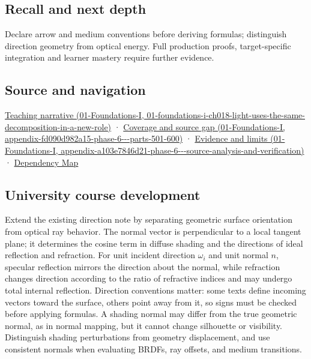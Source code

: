 \subsection{Recall and next depth}\label{appendix-44e00863b4d5-recall-and-next-depth}

Declare arrow and medium conventions before deriving formulas; distinguish direction geometry from optical energy. Full production proofs, target-specific integration and learner mastery require further evidence.

\subsection{Source and navigation}\label{appendix-44e00863b4d5-source-and-navigation}

\href{../01-Foundations-I/main.pdf\#nameddest=01-foundations-i-ch018-light-uses-the-same-decomposition-in-a-new-role}{Teaching narrative (01-Foundations-I, 01-foundations-i-ch018-light-uses-the-same-decomposition-in-a-new-role)} · \href{../01-Foundations-I/main.pdf\#nameddest=appendix-fd090d982a15-phase-6---parts-501-600}{Coverage and source gap (01-Foundations-I, appendix-fd090d982a15-phase-6-\/-\/-parts-501-600)} · \href{../01-Foundations-I/main.pdf\#nameddest=appendix-a103e7846d21-phase-6---source-analysis-and-verification}{Evidence and limits (01-Foundations-I, appendix-a103e7846d21-phase-6-\/-\/-source-analysis-and-verification)} · \hyperref[appendix-4ad47bdd269a]{Dependency Map}

\subsection{University course development}\label{appendix-44e00863b4d5-university-course-development}

Extend the existing direction note by separating geometric surface orientation from optical ray behavior. The normal vector is perpendicular to a local tangent plane; it determines the cosine term in diffuse shading and the directions of ideal reflection and refraction. For unit incident direction \(\omega_i\) and unit normal \(n\), specular reflection mirrors the direction about the normal, while refraction changes direction according to the ratio of refractive indices and may undergo total internal reflection. Direction conventions matter: some texts define incoming vectors toward the surface, others point away from it, so signs must be checked before applying formulas. A shading normal may differ from the true geometric normal, as in normal mapping, but it cannot change silhouette or visibility. Distinguish shading perturbations from geometry displacement, and use consistent normals when evaluating BRDFs, ray offsets, and medium transitions.

